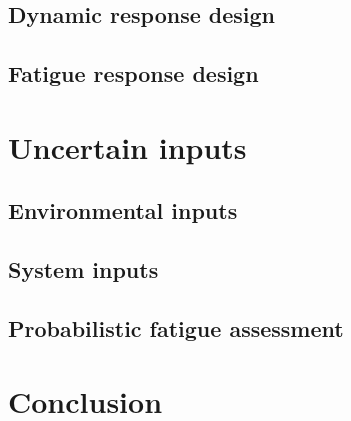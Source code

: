         \subsection{Dynamic response design}
        \subsection{Fatigue response design}
    \section{Uncertain inputs}
        \subsection{Environmental inputs}
        \subsection{System inputs}
        \subsection{Probabilistic fatigue assessment}
    \section{Conclusion}